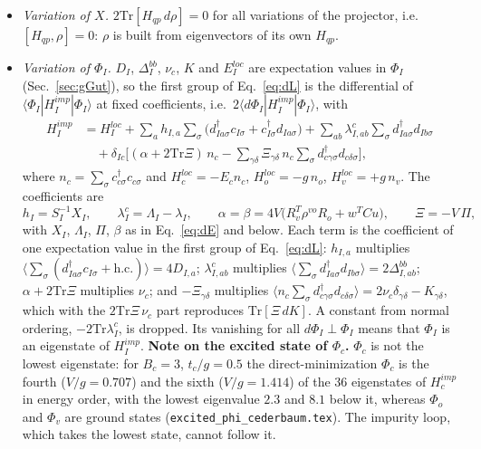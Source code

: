 \documentclass[11pt]{article}
\newcommand{\dg}{^{\dagger}}
\newcommand{\braket}[1]{\langle #1\rangle}
\newcommand{\Tr}{\mathrm{Tr}}
\begin{document}
\begin{itemize}
\item \emph{Variation of $X$.} $2\Tr[H_{qp}\,d\rho]=0$ for all variations of the projector, i.e.\ $[H_{qp},\rho]=0$: $\rho$ is built from eigenvectors of its own $H_{qp}$.
\item \emph{Variation of $\Phi_I$.} $D_I$, $\Delta^{bb}_I$, $\nu_c$, $K$ and $E^{loc}_I$ are expectation values in $\Phi_I$ (Sec.~\ref{sec:gGut}), so the first group of Eq.~\eqref{eq:dL} is the
differential of $\braket{\Phi_I|H^{imp}_I|\Phi_I}$ at fixed coefficients, i.e.\ $2\braket{d\Phi_I|H^{imp}_I|\Phi_I}$, with
\begin{equation}
\begin{aligned}
H^{imp}_I&=H^{loc}_I+\sum_{a}h_{I,a}\sum_\sigma\big(d\dg_{Ia\sigma}c_{I\sigma}+c\dg_{I\sigma}d_{Ia\sigma}\big)+\sum_{ab}\lambda^c_{I,ab}\sum_\sigma d\dg_{Ia\sigma}d_{Ib\sigma}\\
&\quad+\delta_{Ic}\Big[(\alpha+2\Tr\Xi)\,n_c-\sum_{\gamma\delta}\Xi_{\gamma\delta}\,n_c\sum_\sigma d\dg_{c\gamma\sigma}d_{c\delta\sigma}\Big],
\end{aligned}
\label{eq:Himp}
\end{equation}
where $n_c=\sum_\sigma c\dg_{c\sigma}c_{c\sigma}$ and $H^{loc}_c=-E_cn_c$, $H^{loc}_o=-g\,n_o$, $H^{loc}_v=+g\,n_v$. The coefficients are
\begin{equation}
h_I=S_I^{-1}X_I,\qquad\lambda^c_I=\Lambda_I-\lambda_I,\qquad\alpha=\beta=4V\big(R_v^T\rho^{vo}R_o+w^TCu\big),\qquad\Xi=-V\,\Pi,
\end{equation}
with $X_I$, $\Lambda_I$, $\Pi$, $\beta$ as in Eq.~\eqref{eq:dE} and below. Each term is the coefficient of one expectation value in the first group of Eq.~\eqref{eq:dL}:
$h_{I,a}$ multiplies $\braket{\sum_\sigma(d\dg_{Ia\sigma}c_{I\sigma}+\mathrm{h.c.})}=4D_{I,a}$; $\lambda^c_{I,ab}$ multiplies $\braket{\sum_\sigma d\dg_{Ia\sigma}d_{Ib\sigma}}=2\Delta^{bb}_{I,ab}$;
$\alpha+2\Tr\Xi$ multiplies $\nu_c$; and $-\Xi_{\gamma\delta}$ multiplies $\braket{n_c\sum_\sigma d\dg_{c\gamma\sigma}d_{c\delta\sigma}}=2\nu_c\delta_{\gamma\delta}-K_{\gamma\delta}$, which with the
$2\Tr\Xi\,\nu_c$ part reproduces $\Tr[\Xi\,dK]$. A constant from normal ordering, $-2\Tr\lambda^c_I$, is dropped. Its vanishing for all $d\Phi_I\perp\Phi_I$ means that $\Phi_I$ is an eigenstate of $H^{imp}_I$. \textbf{Note on the excited state of $\Phi_c$.} $\Phi_c$ is not the lowest eigenstate: for $B_c=3$, $t_c/g=0.5$ the direct-minimization $\Phi_c$ is the fourth ($V/g=0.707$) and the sixth ($V/g=1.414$) of the $36$ eigenstates of $H^{imp}_c$ in energy order, with the lowest eigenvalue $2.3$ and $8.1$ below it, whereas $\Phi_o$ and $\Phi_v$ are ground states (\texttt{excited\_phi\_cederbaum.tex}). The impurity loop, which takes the lowest state, cannot follow it.
\end{itemize}
\end{document}
